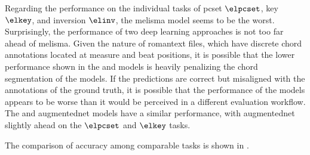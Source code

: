 

Regarding the performance on the individual tasks of
\gls{pcset} $\elpcset$, key $\elkey$, and inversion
$\elinv$, the \gls{melisma} model seems to be the worst.
Surprisingly, the performance of two deep learning
approaches is not too far ahead of \gls{melisma}. Given the
nature of \gls{romantext} files, which have discrete chord
annotations located at measure and beat positions, it is
possible that the lower performance shown in the
\textcite{mcleod2021modular} and \textcite{chen2021attend}
models is heavily penalizing the chord segmentation of the
models. If the predictions are correct but misaligned with
the annotations of the ground truth, it is possible that the
performance of the models appears to be worse than it would
be perceived in a different evaluation workflow. The
\textcite{micchi2021deep} and \gls{augmentednet} models have
a similar performance, with \gls{augmentednet} slightly
ahead on the $\elpcset$ and $\elkey$ tasks.

The comparison of accuracy among comparable tasks is shown
in .
